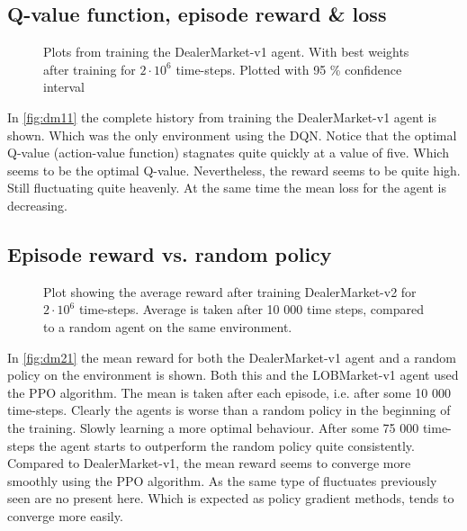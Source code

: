 \documentclass{kththesis}
\theoremstyle{definition}
\begin{document}
\subsection*{Q-value function, episode reward \& loss}
\begin{figure}[H]
	    	\centering
		
		\caption{Plots from training the DealerMarket-v1 agent. With best weights after training for $2\cdot 10^{6}$ time-steps. Plotted with 95 \% confidence interval}
		\label{fig:dm11}
\end{figure}
In \autoref{fig:dm11} the complete history from training the DealerMarket-v1 agent is shown. Which was the only environment using the DQN. Notice that the optimal Q-value (action-value function) stagnates quite quickly at a value of five. Which seems to be the optimal Q-value. Nevertheless, the reward seems to be quite high. Still fluctuating quite heavenly. At the same time the mean loss for the agent is decreasing.

\subsection*{Episode reward vs. random policy}
\begin{figure}[H]
	    	\centering
		
		\caption{Plot showing the average reward after training DealerMarket-v2 for $2\cdot 10^{6}$ time-steps. Average is taken after 10 000 time steps, compared to a random agent on the same environment.}
		\label{fig:dm21}
\end{figure}
In \autoref{fig:dm21} the mean reward for both the DealerMarket-v1 agent and a random policy on the environment is shown. Both this and the LOBMarket-v1 agent used the PPO algorithm. The mean is taken after each episode, i.e. after some 10 000 time-steps. Clearly the agents is worse than a random policy in the beginning of the training. Slowly learning a more optimal behaviour. After some 75 000 time-steps the agent starts to outperform the random policy quite consistently. Compared to DealerMarket-v1, the mean reward seems to converge more smoothly using the PPO algorithm. As the same type of fluctuates previously seen are no present here. Which is expected as policy gradient methods, tends to converge more easily.
\end{document}
